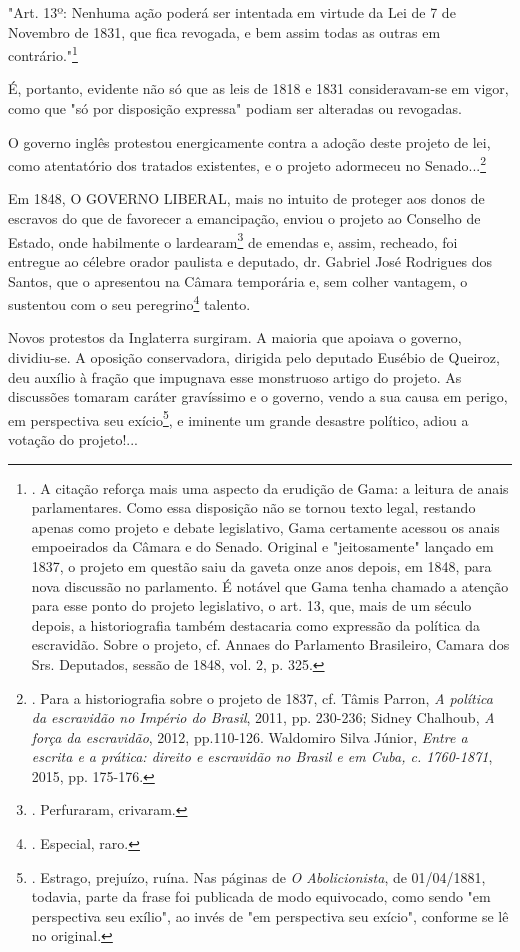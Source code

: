 "Art. 13º: Nenhuma ação poderá ser intentada em virtude da Lei de 7 de
Novembro de 1831, que fica revogada, e bem assim todas as outras em
contrário."\footnote{. A citação reforça mais uma aspecto da erudição de
  Gama: a leitura de anais parlamentares. Como essa disposição não se
  tornou texto legal, restando apenas como projeto e debate legislativo,
  Gama certamente acessou os anais empoeirados da Câmara e do Senado.
  Original e "jeitosamente" lançado em 1837, o projeto em questão saiu
  da gaveta onze anos depois, em 1848, para nova discussão no
  parlamento. É notável que Gama tenha chamado a atenção para esse ponto
  do projeto legislativo, o art. 13, que, mais de um século depois, a
  historiografia também destacaria como expressão da política da
  escravidão. Sobre o projeto, cf. Annaes do Parlamento Brasileiro,
  Camara dos Srs. Deputados, sessão de 1848, vol. 2, p. 325.}

É, portanto, evidente não só que as leis de 1818 e 1831 consideravam-se
em vigor, como que "só por disposição expressa" podiam ser alteradas ou
revogadas.

O governo inglês protestou energicamente contra a adoção deste projeto
de lei, como atentatório dos tratados existentes, e o projeto adormeceu
no Senado...\footnote{. Para a historiografia sobre o projeto de 1837,
  cf. Tâmis Parron, \emph{A política da escravidão no Império do
  Brasil}, 2011, pp. 230-236; Sidney Chalhoub, \emph{A força da
  escravidão}, 2012, pp.110-126. Waldomiro Silva Júnior, \emph{Entre a
  escrita e a prática: direito e escravidão no Brasil e em Cuba, c.
  1760-1871}, 2015, pp. 175-176.}

Em 1848, O GOVERNO LIBERAL, mais no intuito de proteger aos donos de
escravos do que de favorecer a emancipação, enviou o projeto ao Conselho
de Estado, onde habilmente o lardearam\footnote{. Perfuraram, crivaram.}
de emendas e, assim, recheado, foi entregue ao célebre orador paulista e
deputado, dr. Gabriel José Rodrigues dos Santos, que o apresentou na
Câmara temporária e, sem colher vantagem, o sustentou com o seu
peregrino\footnote{. Especial, raro.} talento.

Novos protestos da Inglaterra surgiram. A maioria que apoiava o governo,
dividiu-se. A oposição conservadora, dirigida pelo deputado Eusébio de
Queiroz, deu auxílio à fração que impugnava esse monstruoso artigo do
projeto. As discussões tomaram caráter gravíssimo e o governo, vendo a
sua causa em perigo, em perspectiva seu exício\footnote{. Estrago,
  prejuízo, ruína. Nas páginas de \emph{O Abolicionista}, de 01/04/1881,
  todavia, parte da frase foi publicada de modo equivocado, como sendo
  "em perspectiva seu exílio", ao invés de "em perspectiva seu exício",
  conforme se lê no original.}, e iminente um grande desastre político,
adiou a votação do projeto!...

